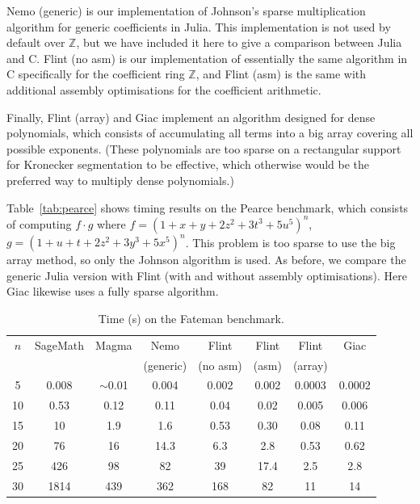\documentclass{sig-alternate-05-2015}
\begin{document}
Nemo (generic) is our implementation of Johnson's sparse
multiplication algorithm for generic coefficients in Julia.
This implementation is not used by default over $\mathbb{Z}$, but we
have included it here to give a comparison between
Julia and C.
Flint (no asm) is our implementation of essentially
the same algorithm in C specifically for the coefficient ring $\mathbb{Z}$,
and Flint (asm) is the same with additional
assembly optimisations for the coefficient arithmetic.

Finally, Flint (array) and Giac implement an algorithm designed
for dense polynomials, which consists of accumulating all terms
into a big array covering all possible exponents.
(These polynomials are too sparse on a rectangular support
for Kronecker segmentation to be effective, which otherwise
would be the preferred way to multiply dense polynomials.)

Table~\ref{tab:pearce} shows timing results on the Pearce
benchmark, which consists of computing $f \cdot g$ where
$f = (1 + x + y + 2z^2 + 3t^3 + 5u^5)^n$,
$g = (1 + u + t + 2z^2 + 3y^3 + 5x^5)^n$.
This problem is too sparse to use the big array method,
so only the Johnson algorithm is used.
As before, we compare the generic Julia version
with Flint (with and without assembly optimisations).
Here Giac likewise uses a fully sparse algorithm.

\begin{table}
\center
\caption{Time (s) on the Fateman benchmark.}
\begin{small}
\setlength{\tabcolsep}{2.5pt}
\renewcommand{\arraystretch}{1.2}
\begin{tabular}{c c c c c c c c} \hline
$n$ & SageMath & Magma & Nemo & Flint & Flint & Flint & Giac \\ 
    &          &       & (generic) & (no asm) & (asm) & (array) & \\ \hline
     5  &  0.008 & $\sim$0.01   & 0.004      &        0.002    &        0.002       &      0.0003    &    0.0002 \\
    10  &  0.53  &   0.12  &   0.11     &         0.04    &         0.02       &         0.005   &      0.006 \\
    15  &   10   &    1.9  &      1.6   &         0.53    &          0.30      &           0.08   &         0.11 \\
    20  &   76   &    16   &    14.3    &          6.3    &            2.8     &            0.53   &         0.62 \\
    25  &  426   &   98    &      82    &          39     &         17.4        &           2.5     &         2.8 \\
    30  & 1814   & 439     &  362       &         168     &            82        &            11     &          14 \\
\end{tabular}
\label{tab:fateman}
\end{small}
\end{table}
\end{document}
